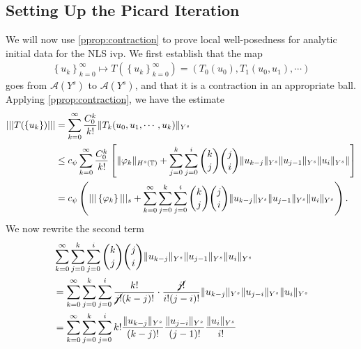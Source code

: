 \subsection{Setting Up the Picard Iteration}
We will now use \cref{pprop:contraction} to prove local well-posedness for
analytic initial data for the NLS ivp. We first establish that the map 
%
%
\begin{equation*}
\begin{split}
  \left\{ u_k \right\}_{k=0}^{\infty} \mapsto T\left( \left\{ u_k
  \right\}_{k=0}^{\infty} \right) = \left( T_0(u_0), T_1(u_0, u_1), \cdots \right)
\end{split}
\end{equation*}
%
%
goes from $\mathcal{A}(Y^s)$ to $\mathcal{A}(Y^s)$, and that it is a contraction
in an appropriate ball.
%
Applying \cref{pprop:contraction}, we have the estimate
%
%
\begin{equation}
\begin{split}
  | | |T(\left\{ u_{k} \right\}) | | |
  & = \sum_{k=0}^{\infty} \frac{C_0^k}{k!} \|T_{k}(u_0, u_1, \cdots, u_k)
  \|_{Y^s}
  \\
  & \le c_{\psi} \sum_{k=0}^{\infty} \frac{C_0^k}{k!}\left[ \| \varphi_{k}
  \|_{H^s(\mathbb{T})} + \sum_{j=0}^{k} \sum_{j=0}^{i} {k \choose j } {j \choose i }
  \|u_{k-j}\|_{Y^s} \| u_{j-1}\|_{Y^s} \|u_{i} \|_{Y^s} \| \right]
  \\
  & = c_{\psi}\left( | | | \left\{ \varphi_{k} \right\} | | |_{s} +
  \sum_{k=0}^{\infty} \sum_{j=0}^{k}
  \sum_{j=0}^{i} {k \choose j } {j \choose i }
  \|u_{k-j}\|_{Y^s} \| u_{j-1}\|_{Y^s} \| u_{i} \|_{Y^s}\right).
\end{split}
\label{peqn:map-onto-ball}
\end{equation}
%
%
We now rewrite the second term
%
%
\begin{equation*}
\begin{split}
  & \sum_{k=0}^{\infty} \sum_{j=0}^{k}  \sum_{j=0}^{i} {k \choose j } {j \choose i } \|u_{k-j}\|_{Y^s}
\| u_{j-1}\|_{Y^s} \| u_{i} \|_{Y^s} 
  \\
  & = \sum_{k=0}^{\infty} \sum_{j=0}^{k}  \sum_{j=0}^{i} \frac{k!}{\cancel{j!}(k-j)!}
  \cdot \frac{\cancel{j!}}{i!(j-i)!} \| u_{k-j} \|_{Y^s} \| u_{j-i} \|_{Y^s} \|
  u_{i} \|_{Y^s}
  \\
  & = \sum_{k=0}^{\infty} \sum_{j=0}^{k}  \sum_{j=0}^{i}  k! \frac{\|
  u_{k-j} \|_{Y^s}}{(k-j)!} \frac{\| u_{j-i} \|_{Y^s}}{(j-1)!} \frac{\|
  u_{i} \|_{Y^s}}{i!}
\end{split}
\end{equation*}
